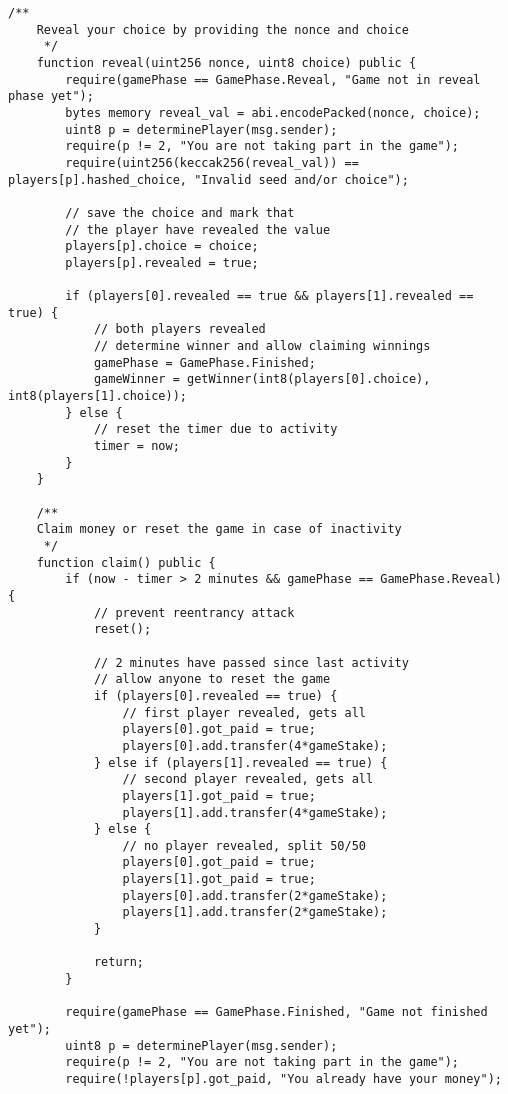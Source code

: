 \documentclass{article}
\begin{document}
\begin{lstlisting}[language=Solidity]
    /**
    Reveal your choice by providing the nonce and choice
     */
    function reveal(uint256 nonce, uint8 choice) public {
        require(gamePhase == GamePhase.Reveal, "Game not in reveal phase yet");
        bytes memory reveal_val = abi.encodePacked(nonce, choice);
        uint8 p = determinePlayer(msg.sender);
        require(p != 2, "You are not taking part in the game");
        require(uint256(keccak256(reveal_val)) == players[p].hashed_choice, "Invalid seed and/or choice");

        // save the choice and mark that
        // the player have revealed the value
        players[p].choice = choice;
        players[p].revealed = true;

        if (players[0].revealed == true && players[1].revealed == true) {
            // both players revealed
            // determine winner and allow claiming winnings
            gamePhase = GamePhase.Finished;
            gameWinner = getWinner(int8(players[0].choice), int8(players[1].choice));
        } else {
            // reset the timer due to activity
            timer = now;
        }
    }

    /**
    Claim money or reset the game in case of inactivity
     */
    function claim() public {
        if (now - timer > 2 minutes && gamePhase == GamePhase.Reveal) {
            // prevent reentrancy attack
            reset();

            // 2 minutes have passed since last activity
            // allow anyone to reset the game
            if (players[0].revealed == true) {
                // first player revealed, gets all
                players[0].got_paid = true;
                players[0].add.transfer(4*gameStake);
            } else if (players[1].revealed == true) {
                // second player revealed, gets all
                players[1].got_paid = true;
                players[1].add.transfer(4*gameStake);
            } else {
                // no player revealed, split 50/50
                players[0].got_paid = true;
                players[1].got_paid = true;
                players[0].add.transfer(2*gameStake);
                players[1].add.transfer(2*gameStake);
            }

            return;
        }

        require(gamePhase == GamePhase.Finished, "Game not finished yet");
        uint8 p = determinePlayer(msg.sender);
        require(p != 2, "You are not taking part in the game");
        require(!players[p].got_paid, "You already have your money");


\end{lstlisting}
\end{document}
